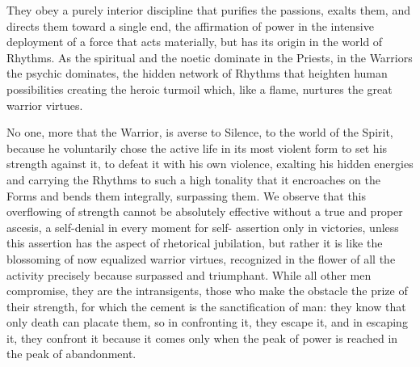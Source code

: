 They obey a purely interior discipline that purifies the passions, exalts them, and directs them toward a single end, the affirmation of power in the intensive deployment of a force that acts materially, but has its origin in the world of Rhythms. As the spiritual and the noetic dominate in the Priests, in the Warriors the psychic dominates, the hidden network of Rhythms that heighten human possibilities creating the heroic turmoil which, like a flame, nurtures the great warrior virtues.

No one, more that the Warrior, is averse to Silence, to the world of the Spirit, because he voluntarily chose the active life in its most violent form to set his strength against it, to defeat it with his own violence, exalting his hidden energies and carrying the Rhythms to such a high tonality that it encroaches on the Forms and bends them integrally, surpassing them. We observe that this overflowing of strength cannot be absolutely effective without a true and proper ascesis, a self-denial in every moment for self- assertion only in victories, unless this assertion has the aspect of rhetorical jubilation, but rather it is like the blossoming of now equalized warrior virtues, recognized in the flower of all the activity precisely because surpassed and triumphant. While all other men compromise, they are the intransigents, those who make the obstacle the prize of their strength, for which the cement is the sanctification of man: they know that only death can placate them, so in confronting it, they escape it, and in escaping it, they confront it because it comes only when the peak of power is reached in the peak of abandonment.

